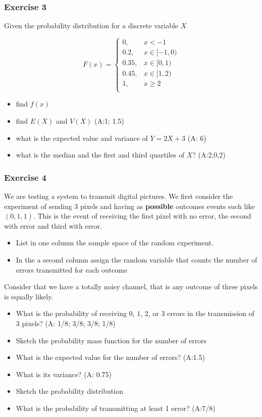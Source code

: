\documentclass[
]{book}
\providecommand{\tightlist}{%
  \setlength{\itemsep}{0pt}\setlength{\parskip}{0pt}}
\begin{document}
\hypertarget{exercise-3-2}{%
\subsubsection{Exercise 3}\label{exercise-3-2}}

Given the probability distribution for a discrete variable \(X\)

\[
    F(x)= 
\begin{cases}
0, & x < -1 \\
0.2,& x \in [-1,0)\\
0.35,& x \in [0,1)\\
0.45,& x \in [1,2)\\
1,& x \geq 2\\
\end{cases}
\]

\begin{itemize}
\tightlist
\item
  find \(f(x)\)
\item
  find \(E(X)\) and \(V(X)\) (A:1; 1.5)
\item
  what is the expected value and variance of \(Y=2X+3\) (A: 6)
\item
  what is the median and the first and third quartiles of \(X\)? (A:2,0,2)
\end{itemize}

\hypertarget{exercise-4-1}{%
\subsubsection{Exercise 4}\label{exercise-4-1}}

We are testing a system to transmit digital pictures. We first consider the experiment of sending \(3\) pixels and having as \textbf{possible} outcomes events such like \((0,1,1)\). This is the event of receiving the first pixel with no error, the second with error and third with error.

\begin{itemize}
\item
  List in one column the sample space of the random experiment.
\item
  In the a second column assign the random variable that counts the number of errors transmitted for each outcome
\end{itemize}

Consider that we have a totally noisy channel, that is any outcome of three pixels is equally likely.

\begin{itemize}
\item
  What is the probability of receiving \(0\), \(1\), \(2\), or \(3\) errors in the transmission of \(3\) pixels? (A: 1/8; 3/8; 3/8; 1/8)
\item
  Sketch the probability mass function for the number of errors
\item
  What is the expected value for the number of errors? (A:1.5)
\item
  What is its variance? (A: 0.75)
\item
  Sketch the probability distribution
\item
  What is the probability of transmitting at least 1 error? (A:7/8)
\end{itemize}
\end{document}
